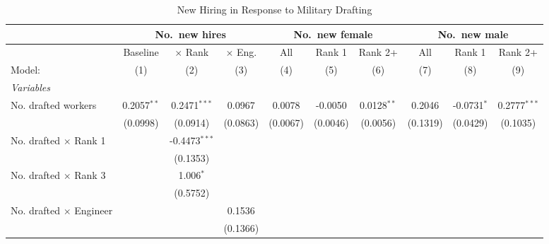 \begin{table}[htbp]
\centering
\caption{New Hiring in Response to Military Drafting}
\label{tab:reallocation-newhires}
\scriptsize
\begin{threeparttable}
\begin{tabular}{lccccccccc}
   \tabularnewline \midrule \midrule
 & \multicolumn{3}{c}{No.\ new hires} & \multicolumn{3}{c}{No.\ new female} & \multicolumn{3}{c}{No.\ new male} \\
\midrule
                                  & Baseline      & $\times$ Rank   & $\times$ Eng.  & All      & Rank 1   & Rank 2+       & All      & Rank 1        & Rank 2+ \\   
   Model:                         & (1)           & (2)             & (3)            & (4)      & (5)      & (6)           & (7)      & (8)           & (9)\\  
   \midrule
   \emph{Variables}\\
   No. drafted workers            & 0.2057$^{**}$ & 0.2471$^{***}$  & 0.0967         & 0.0078   & -0.0050  & 0.0128$^{**}$ & 0.2046   & -0.0731$^{*}$ & 0.2777$^{***}$\\   
                                  & (0.0998)      & (0.0914)        & (0.0863)       & (0.0067) & (0.0046) & (0.0056)      & (0.1319) & (0.0429)      & (0.1035)\\   
   No. drafted $\times$ Rank 1    &               & -0.4473$^{***}$ &                &          &          &               &          &               &   \\   
                                  &               & (0.1353)        &                &          &          &               &          &               &   \\   
   No. drafted $\times$ Rank 3    &               & 1.006$^{*}$     &                &          &          &               &          &               &   \\   
                                  &               & (0.5752)        &                &          &          &               &          &               &   \\   
   No. drafted $\times$ Engineer  &               &                 & 0.1536         &          &          &               &          &               &   \\   
                                  &               &                 & (0.1366)       &          &          &               &          &               &   \\   

\end{tabular}
\end{threeparttable}
\end{table}
